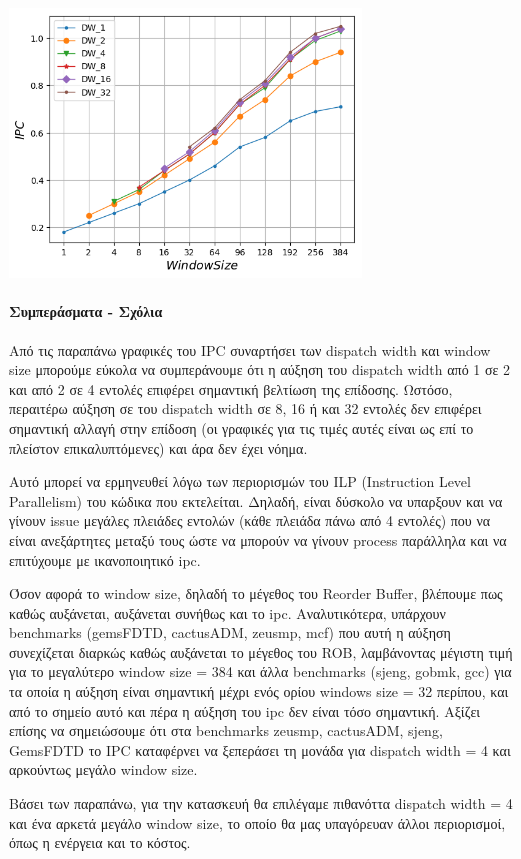    \begin{minipage}{\textwidth}
      \begin{center}
         \\
         \vspace{3mm}
         \includegraphics[width=0.7\textwidth, frame]{./graphs/ipc/GemsFDTD.png}
         \vspace{6mm}
      \end{center}
   \end{minipage}


   \paragraph{Συμπεράσματα - Σχόλια}
   Από τις παραπάνω γραφικές του IPC συναρτήσει των dispatch width και window
   size μπορούμε εύκολα να συμπεράνουμε ότι η αύξηση του dispatch width από 1 σε
   2 και από 2 σε 4 εντολές επιφέρει σημαντική βελτίωση της επίδοσης. Ωστόσο,
   περαιτέρω αύξηση σε του dispatch width σε 8, 16 ή και 32 εντολές δεν επιφέρει
   σημαντική αλλαγή στην επίδοση (οι γραφικές για τις τιμές αυτές είναι ως επί
   το πλείστον επικαλυπτόμενες) και άρα δεν έχει νόημα.

   Αυτό μπορεί να ερμηνευθεί λόγω των περιορισμών του ILP (Instruction Level
   Parallelism) του κώδικα που εκτελείται. Δηλαδή, είναι δύσκολο να υπαρξουν και
   να γίνουν issue μεγάλες πλειάδες εντολών (κάθε πλειάδα πάνω από 4 εντολές)
   που να είναι ανεξάρτητες μεταξύ τους ώστε να μπορούν να γίνουν process
   παράλληλα και να επιτύχουμε με ικανοποιητικό ipc. 


   Όσον αφορά το window size, δηλαδή το μέγεθος του Reorder Buffer, βλέπουμε πως
   καθώς αυξάνεται, αυξάνεται συνήθως και το ipc. Αναλυτικότερα, υπάρχουν
   benchmarks (gemsFDTD, cactusADM, zeusmp, mcf)  που αυτή η αύξηση συνεχίζεται
   διαρκώς καθώς αυξάνεται το μέγεθος του ROB, λαμβάνοντας μέγιστη τιμή για το
   μεγαλύτερο window size = 384 και άλλα benchmarks (sjeng, gobmk, gcc) για τα
   οποία η αύξηση είναι σημαντική μέχρι ενός ορίου windows size = 32 περίπου,
   και από το σημείο αυτό και πέρα η αύξηση του ipc δεν είναι τόσο σημαντική.
   Αξίζει επίσης να σημειώσουμε ότι στα benchmarks zeusmp, cactusADM, sjeng,
   GemsFDTD το IPC καταφέρνει να ξεπεράσει τη μονάδα για dispatch width = 4 και
   αρκούντως μεγάλο window size.

   Βάσει των παραπάνω, για την κατασκευή θα επιλέγαμε πιθανόττα dispatch width =
   4 και ένα αρκετά μεγάλο window size, το οποίο θα μας υπαγόρευαν άλλοι
   περιορισμοί, όπως η ενέργεια και το κόστος.